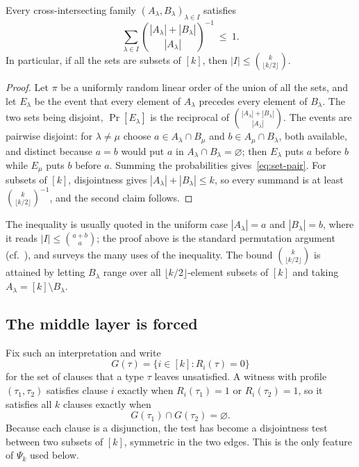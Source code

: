 \begin{lemma}\label{lem:bollobas}
Every cross-intersecting family $(A_\lambda,B_\lambda)_{\lambda\in I}$
satisfies
\begin{equation}\label{eq:set-pair}
 \sum_{\lambda\in I}\binom{|A_\lambda|+|B_\lambda|}{|A_\lambda|}^{-1}\ \le\ 1 .
\end{equation}
In particular, if all the sets are subsets of $[k]$, then
$|I|\le\binom{k}{\lfloor k/2\rfloor}$.
\end{lemma}
\begin{proof}
Let $\pi$ be a uniformly random linear order of the union of all the sets,
and let $E_\lambda$ be the event that every element of $A_\lambda$ precedes
every element of $B_\lambda$. The two sets being disjoint, $\Pr[E_\lambda]$
is the reciprocal of $\binom{|A_\lambda|+|B_\lambda|}{|A_\lambda|}$. The
events are pairwise disjoint: for $\lambda\ne\mu$ choose
$a\in A_\lambda\cap B_\mu$ and $b\in A_\mu\cap B_\lambda$, both available,
and distinct because $a=b$ would put $a$ in
$A_\lambda\cap B_\lambda=\varnothing$; then $E_\lambda$ puts $a$ before $b$
while $E_\mu$ puts $b$ before $a$. Summing the probabilities
gives~\eqref{eq:set-pair}. For subsets of $[k]$, disjointness gives
$|A_\lambda|+|B_\lambda|\le k$, so every summand is at least
$\binom{k}{\lfloor k/2\rfloor}^{-1}$, and the second claim follows.
\end{proof}
The inequality is usually quoted in the uniform case $|A_\lambda|=a$ and
$|B_\lambda|=b$, where it reads $|I|\le\binom{a+b}{a}$; the proof above is
the standard permutation argument (cf.~\citet{katona1974}), and
\citet{tuza1994} surveys the many uses of the inequality. The bound
$\binom{k}{\lfloor k/2\rfloor}$ is attained by letting $B_\lambda$ range
over all $\lfloor k/2\rfloor$-element subsets of $[k]$ and taking
$A_\lambda=[k]\setminus B_\lambda$.

\subsection{The middle layer is forced}\label{app:middle}
Fix such an interpretation and write
\[
 G(\tau)=\{i\in[k]:R_i(\tau)=0\}
\]
for the set of clauses that a type $\tau$ leaves unsatisfied. A witness with
profile $(\tau_1,\tau_2)$ satisfies clause $i$ exactly when $R_i(\tau_1)=1$
or $R_i(\tau_2)=1$, so it satisfies all $k$ clauses exactly when
\begin{equation}\label{eq:gap-disjoint}
 G(\tau_1)\cap G(\tau_2)=\varnothing.
\end{equation}
Because each clause is a disjunction, the test has become a disjointness
test between two subsets of $[k]$, symmetric in the two edges. This is the
only feature of $\Psi_k$ used below.

